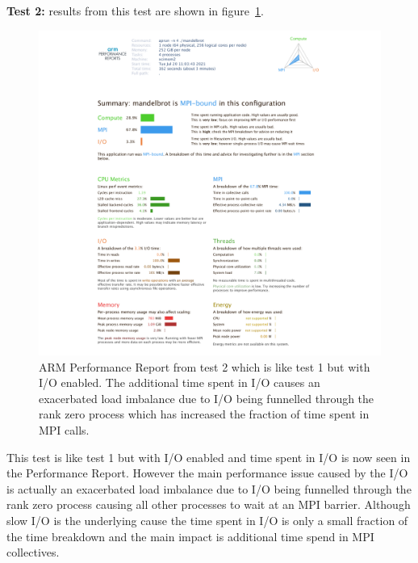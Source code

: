 \documentclass[a4paper,titlepage]{article}
\begin{document}
\noindent
\textbf{Test 2:} results from this test are shown in figure~\ref{fig:perf-report_MB1_IO}.
\begin{figure}[htbp]
\begin{center}
\includegraphics[scale=0.35]{figures/mandelbrot_v1_IO_PerformanceReport}
\caption{ARM Performance Report from test 2 which is like test 1 but with I/O enabled. The additional time spent in I/O causes an exacerbated load imbalance due to I/O being funnelled through the rank zero process which has increased the fraction of time spent in MPI calls. }
\label{fig:perf-report_MB1_IO}
\end{center}
\end{figure}
This test is like test 1 but with I/O enabled and time spent in I/O is now seen in the Performance Report. However the main performance issue caused by the I/O is actually 
an exacerbated load imbalance due to I/O being funnelled through the rank zero process causing all other processes to wait at an MPI barrier. Although slow I/O is the underlying cause the time spent in I/O is only a small fraction of the time breakdown and the main impact is additional time spend in MPI collectives. \\
\end{document}

